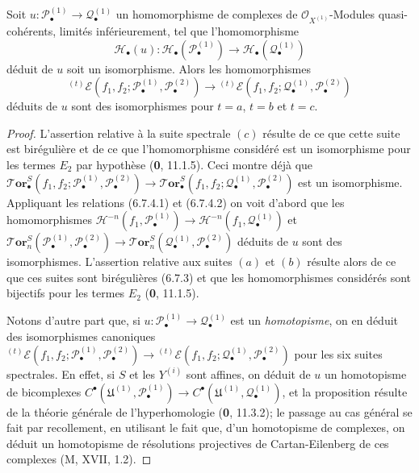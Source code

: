 \begin{proposition}[6.7.5]
Soit $u:\mathscr P_\bullet^{(1)}\to\mathscr Q_\bullet^{(1)}$ un
homomorphisme de complexes de $\mathscr O_{X^{(1)}}$-Modules quasi-cohérents,
limités inférieurement, tel que l'homomorphisme
\[
  \mathscr H_\bullet(u):
  \mathscr H_\bullet(\mathscr P_\bullet^{(1)})
  \longrightarrow
  \mathscr H_\bullet(\mathscr Q_\bullet^{(1)})
\]
déduit de $u$ soit un isomorphisme. Alors les homomorphismes
\[
  {}^{(t)}\mathscr E
  (f_1,f_2;\mathscr P_\bullet^{(1)},\mathscr P_\bullet^{(2)})
  \longrightarrow
  {}^{(t)}\mathscr E
  (f_1,f_2;\mathscr Q_\bullet^{(1)},\mathscr P_\bullet^{(2)})
\]
déduits de $u$ sont des isomorphismes pour $t=a$, $t=b$ et $t=c$.
\end{proposition}

\begin{proof}
L'assertion relative à la suite spectrale $(c)$ résulte de ce que cette suite
est birégulière et de ce que l'homomorphisme considéré est un isomorphisme pour
les termes $E_2$ par hypothèse (\textbf{0}, 11.1.5). Ceci montre déjà que
$
  \boldsymbol{\mathscr{T}\!or}_\bullet^S
  (f_1,f_2;\mathscr P_\bullet^{(1)},\mathscr P_\bullet^{(2)})
  \longrightarrow
  \boldsymbol{\mathscr{T}\!or}_\bullet^S
  (f_1,f_2;\mathscr Q_\bullet^{(1)},\mathscr P_\bullet^{(2)})
$
est un isomorphisme. Appliquant les relations (6.7.4.1) et (6.7.4.2) on voit
d'abord que les homomorphismes
$
  \mathcal H^{-n}(f_1,\mathscr P_\bullet^{(1)})
  \longrightarrow
  \mathcal H^{-n}(f_1,\mathscr Q_\bullet^{(1)})
  $ et $
  \boldsymbol{\mathscr{T}\!or}_n^S
  (\mathscr P_\bullet^{(1)},\mathscr P_\bullet^{(2)})
  \longrightarrow
  \boldsymbol{\mathscr{T}\!or}_n^S
  (\mathscr Q_\bullet^{(1)},\mathscr P_\bullet^{(2)})
$
déduits de $u$ sont des isomorphismes. L'assertion relative aux suites $(a)$
et $(b)$ résulte alors de ce que ces suites sont birégulières (6.7.3) et que
les homomorphismes considérés sont bijectifs pour les termes $E_2$
(\textbf{0}, 11.1.5).

Notons d'autre part que, si
$u:\mathscr P_\bullet^{(1)}\to\mathscr Q_\bullet^{(1)}$ est un
\emph{homotopisme}, on en déduit des isomorphismes canoniques
$
  {}^{(t)}\mathscr E
  (f_1,f_2;\mathscr P_\bullet^{(1)},\mathscr P_\bullet^{(2)})
  \longrightarrow
  {}^{(t)}\mathscr E
  (f_1,f_2;\mathscr Q_\bullet^{(1)},\mathscr P_\bullet^{(2)})
$
pour les six suites spectrales. En effet, si $S$ et les $Y^{(i)}$ sont affines,
on déduit de $u$ un homotopisme de bicomplexes
$
  C^\bullet(\mathfrak U^{(1)},\mathscr P_\bullet^{(1)})
  \longrightarrow
  C^\bullet(\mathfrak U^{(1)},\mathscr Q_\bullet^{(1)})$,
et la proposition résulte de la théorie générale de l'hyperhomologie
(\textbf{0}, 11.3.2); le passage au cas général se fait par recollement,
en utilisant le fait que, d'un homotopisme de complexes, on déduit un
homotopisme de résolutions projectives de Cartan-Eilenberg de ces complexes
(M, XVII, 1.2).
\end{proof}

